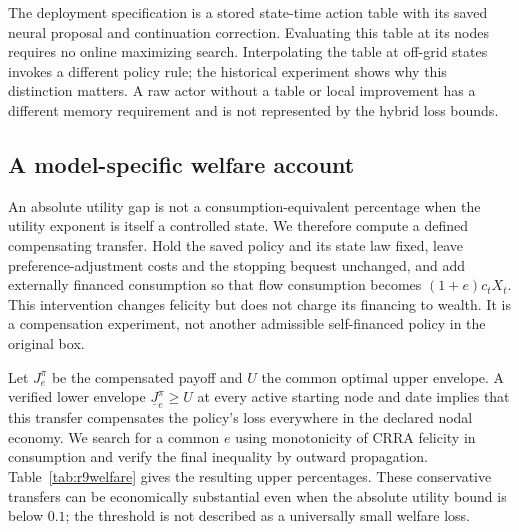 The deployment specification is a stored state-time action table with its saved neural proposal and continuation correction. Evaluating this table at its nodes requires no online maximizing search. Interpolating the table at off-grid states invokes a different policy rule; the historical experiment shows why this distinction matters. A raw actor without a table or local improvement has a different memory requirement and is not represented by the hybrid loss bounds.

\subsection{A model-specific welfare account}
An absolute utility gap is not a consumption-equivalent percentage when the utility exponent is itself a controlled state. We therefore compute a defined compensating transfer. Hold the saved policy and its state law fixed, leave preference-adjustment costs and the stopping bequest unchanged, and add externally financed consumption so that flow consumption becomes $(1+e)c_tX_t$. This intervention changes felicity but does not charge its financing to wealth. It is a compensation experiment, not another admissible self-financed policy in the original box.

Let $J_e^\pi$ be the compensated payoff and $U$ the common optimal upper envelope. A verified lower envelope $\underline J_e^\pi\geq U$ at every active starting node and date implies that this transfer compensates the policy's loss everywhere in the declared nodal economy. We search for a common $e$ using monotonicity of CRRA felicity in consumption and verify the final inequality by outward propagation. Table~\ref{tab:r9welfare} gives the resulting upper percentages. These conservative transfers can be economically substantial even when the absolute utility bound is below $0.1$; the threshold is not described as a universally small welfare loss.


